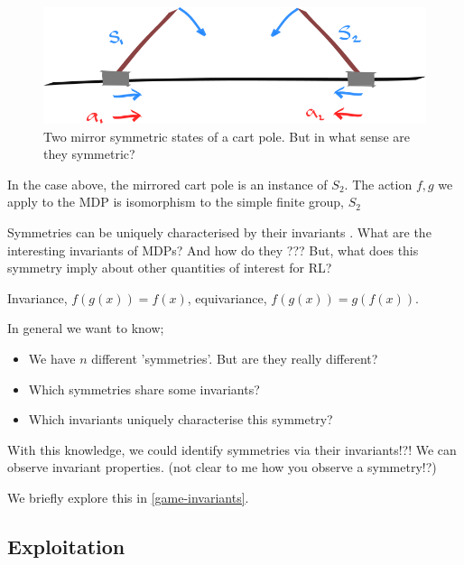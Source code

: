 
\begin{figure}[h!]
	\centering
	\includegraphics[width=1\textwidth,height=0.25\textheight]{../../pictures/drawings/cart-pole-mirror.png}
	\caption{Two mirror symmetric states of a cart pole. But in what sense are they symmetric?}
\end{figure}

In the case above, the mirrored cart pole is an instance of $S_2$.
The action $f, g$ we apply to the MDP is isomorphism to the simple finite group, $S_2$

Symmetries can be uniquely characterised by their invariants \cite{PeterOlver1999}.
What are the interesting invariants of MDPs? And how do they ???
But, what does this symmetry imply about other quantities of interest for RL?

Invariance, $f(g(x)) = f(x)$, equivariance, $f(g(x)) = g(f(x))$.

In general we want to know;

\begin{itemize}
	\tightlist
	\item We have $n$ different 'symmetries'. But are they really different?
	\item Which symmetries share some invariants?
	\item Which invariants uniquely characterise this symmetry?
\end{itemize}

With this knowledge, we could identify symmetries via their invariants!?!
We can observe invariant properties. (not clear to me how you observe a symmetry!?)

We briefly explore this in \ref{game-invariants}.

\subsection{Exploitation} \label{symmetric-exploitation}

